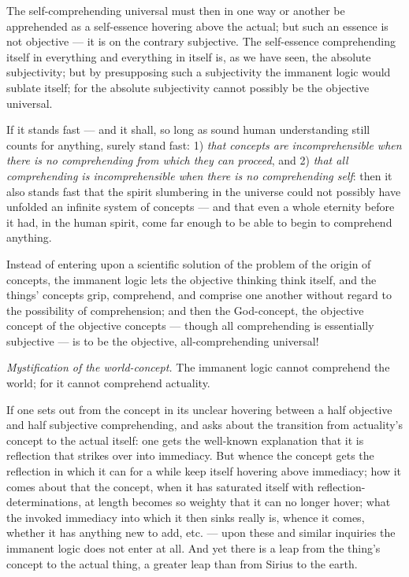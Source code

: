 \documentclass[12pt]{book}
\begin{document}
The self-comprehending universal must then in one way or another be
apprehended as a self-essence hovering above the actual; but such an
essence is not objective --- it is on the contrary subjective. The
self-essence comprehending itself in everything and everything in
itself is, as we have seen, the absolute subjectivity; but by
presupposing such a subjectivity the immanent logic would sublate
itself; for the absolute subjectivity cannot possibly be the
objective universal.

If it stands fast --- and it shall, so long as sound human
understanding still counts for anything, surely stand fast: 1)
\emph{that concepts are incomprehensible when there is no
comprehending from which they can proceed}, and 2) \emph{that all
comprehending is incomprehensible when there is no comprehending
self}: then it also stands fast that the spirit slumbering in the
universe could not possibly have unfolded an infinite system of
concepts --- and that even a whole eternity before it had, in the
human spirit, come far enough to be able to begin to comprehend
anything.

Instead of entering upon a scientific solution of the problem of the
origin of concepts, the immanent logic lets the objective thinking
think itself, and the things' concepts grip, comprehend, and
comprise one another without regard to the possibility of
comprehension; and then the God-concept, the objective concept of
the objective concepts --- though all comprehending is essentially
subjective --- is to be the objective, all-comprehending universal!

\emph{Mystification of the world-concept.} The immanent logic cannot
comprehend the world; for it cannot comprehend actuality.

If one sets out from the concept in its unclear hovering between a
half objective and half subjective comprehending, and asks about the
transition from actuality's concept to the actual itself: one gets
the well-known explanation that it is reflection that strikes over
into immediacy. But whence the concept gets the reflection in which
it can for a while keep itself hovering above immediacy; how it
comes about that the concept, when it has saturated itself with
reflection-determinations, at length becomes so weighty that it can
no longer hover; what the invoked immediacy into which it then sinks
really is, whence it comes, whether it has anything new to add, etc.
--- upon these and similar inquiries the immanent logic
does not enter at all. And yet there is a leap from the thing's
concept to the actual thing, a greater leap than from Sirius to the
earth.
\end{document}
